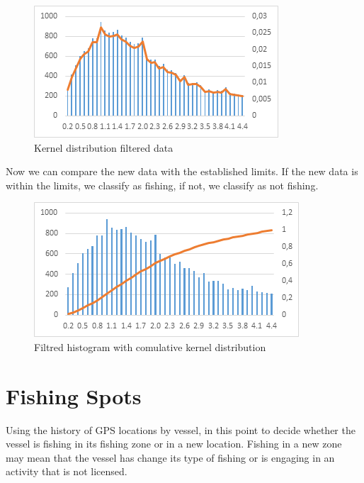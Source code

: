 \begin{figure}[H]
    \centering
    \includegraphics[width=0.8\linewidth]{Chapters/img/hist_kernel.png}
    \caption{Kernel distribution filtered data}
    \label{fig:hist_kernel}
\end{figure}


Now we can compare the new data with the established limits. If the new data is within the limits, we classify as fishing, if not, we classify as not fishing.

\begin{figure}[H]
    \centering
    \includegraphics[width=0.8\linewidth]{Chapters/img/hist_comulative.png}
    \caption{Filtred histogram with comulative kernel distribution}
    \label{fig:hist_comulative}
\end{figure}




\section{Fishing Spots} %
\label{sub:fishing_spots}

Using the history of GPS locations by vessel, in this point to decide whether the vessel is fishing in its fishing zone or in a new location.
Fishing in a new zone may mean that the vessel has change its type of fishing or is engaging in an activity that is not licensed.



